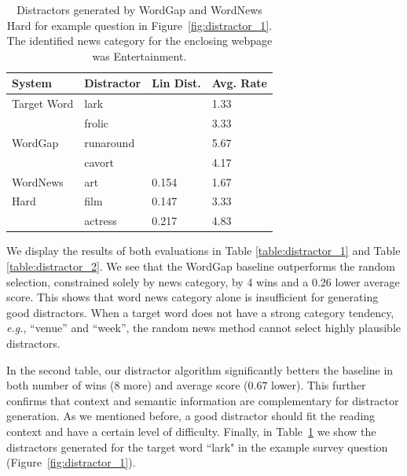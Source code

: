 \begin{table}[ht]
\caption{Distractors generated by WordGap and WordNews Hard for example question in Figure~\ref{fig:distractor_1}.  The identified news category for the enclosing webpage was Entertainment.} 
\label{table:example_distractors}
\centering
\small
\begin{tabular}{|l|l|l|l|}
\hline
System & {\bf Distractor} & {\bf Lin Dist.} & {\bf Avg. Rate} \\ \hline
\hline
Target Word                   & lark       &       & 1.33       \\ \hline
\hline
\multirow{3}{*}{WordGap}      & frolic     &       & 3.33       \\ \cline{2-4} 
                              & runaround  &       & 5.67       \\ \cline{2-4} 
                              & cavort     &       & 4.17       \\ \hline
WordNews                      & art        & 0.154 & 1.67       \\ \cline{2-4} 
Hard                          & film       & 0.147 & 3.33       \\ \cline{2-4} 
                              & actress    & 0.217 & 4.83       \\ \hline
\end{tabular}
\end{table}

We display the results of both evaluations in Table
\ref{table:distractor_1} and Table \ref{table:distractor_2}.  We see
that the WordGap baseline outperforms the random selection,
constrained solely by news category, by 4 wins and a 0.26 lower
average score.  This shows that word news category alone is
insufficient for generating good distractors.  When a target word does
not have a strong category tendency, {\it e.g.}, ``venue'' and
``week'', the random news method cannot select highly plausible
distractors. 

In the second table, our distractor algorithm significantly betters
the baseline in both number of wins (8 more) and average score ($0.67$
lower).  This further confirms that context and semantic information
are complementary for distractor generation. As we mentioned before, a
good distractor should fit the reading context and have a certain
level of difficulty.
Finally, in Table~\ref{table:example_distractors} we show the distractors generated for the target word “lark" in the example survey question (Figure~\ref{fig:distractor_1}).



